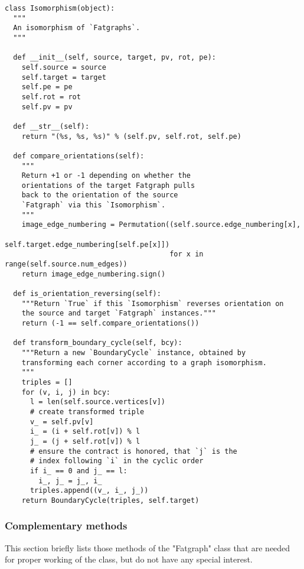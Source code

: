 \begin{lstlisting}
class Isomorphism(object):
  """
  An isomorphism of `Fatgraphs`.
  """

  def __init__(self, source, target, pv, rot, pe):
    self.source = source
    self.target = target
    self.pe = pe
    self.rot = rot
    self.pv = pv

  def __str__(self):
    return "(%s, %s, %s)" % (self.pv, self.rot, self.pe)

  def compare_orientations(self):
    """
    Return +1 or -1 depending on whether the 
    orientations of the target Fatgraph pulls 
    back to the orientation of the source 
    `Fatgraph` via this `Isomorphism`.
    """
    image_edge_numbering = Permutation((self.source.edge_numbering[x],
                                        self.target.edge_numbering[self.pe[x]])
                                       for x in range(self.source.num_edges))
    return image_edge_numbering.sign()

  def is_orientation_reversing(self):
    """Return `True` if this `Isomorphism` reverses orientation on
    the source and target `Fatgraph` instances."""
    return (-1 == self.compare_orientations())

  def transform_boundary_cycle(self, bcy):
    """Return a new `BoundaryCycle` instance, obtained by
    transforming each corner according to a graph isomorphism.
    """
    triples = []
    for (v, i, j) in bcy:
      l = len(self.source.vertices[v])
      # create transformed triple 
      v_ = self.pv[v]
      i_ = (i + self.rot[v]) % l
      j_ = (j + self.rot[v]) % l
      # ensure the contract is honored, that `j` is the
      # index following `i` in the cyclic order
      if i_ == 0 and j_ == l:
        i_, j_ = j_, i_
      triples.append((v_, i_, j_))
    return BoundaryCycle(triples, self.target)
\end{lstlisting}

\subsubsection{Complementary methods}
\label{sec:complementary}

This section briefly lists those methods of the "Fatgraph" class that
are needed for proper working of the class, but do not have any
special interest.

